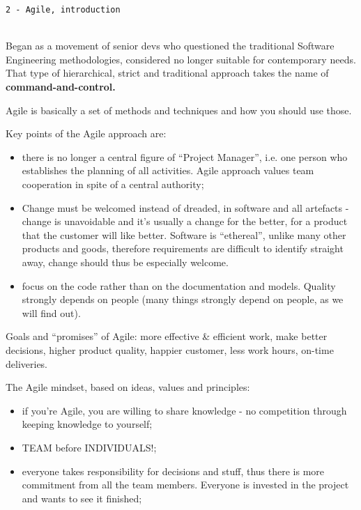
\begin{center}\texttt{2 - Agile, introduction}\end{center}
\hrulefill \\

\noindent Began as a movement of senior devs who questioned the traditional Software Engineering methodologies, considered no longer suitable for contemporary needs. That type of hierarchical, strict and traditional approach takes the name of \textbf{command-and-control.}

 Agile is basically a set of methods and techniques and how you should use those.

 \noindent Key points of the Agile approach are:
 \begin{itemize}
     \item there is no longer a central figure of ``Project Manager'', i.e. one person who establishes the planning of all activities. Agile approach values team cooperation in spite of a central authority;
     \item Change must be welcomed instead of dreaded, in software and all artefacts - change is unavoidable and it's usually a change for the better, for a product that the customer will like better. Software is ``ethereal'', unlike many other products and goods, therefore requirements are difficult to identify straight away, change should thus be especially welcome.
     \item focus on the code rather than on the documentation and models. Quality strongly depends on people (many things strongly depend on people, as we will find out).
 \end{itemize}

\noindent Goals and ``promises'' of Agile: more effective \& efficient work, make better decisions, higher product quality, happier customer, less work hours, on-time deliveries.

 \noindent The Agile mindset, based on ideas, values and principles:
 \begin{itemize}
     \item if you're Agile, you are willing to share knowledge - no competition through keeping knowledge to yourself;
     \item TEAM before INDIVIDUALS!;
     \item everyone takes responsibility for decisions and stuff, thus there is more commitment from all the team members. Everyone is invested in the project and wants to see it finished;
 \end{itemize}

